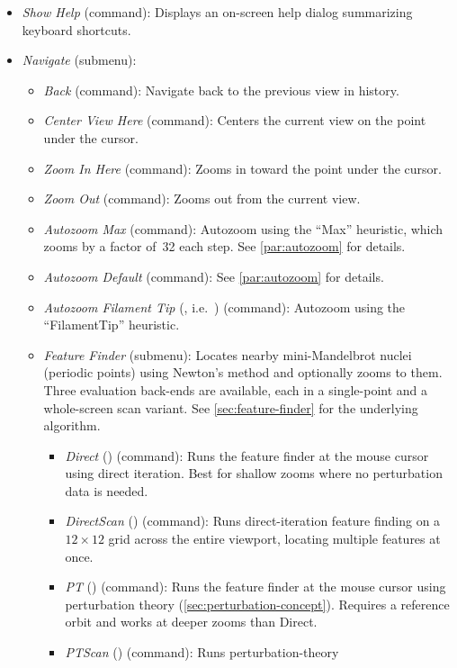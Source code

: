 \begin{itemize}
  \item \emph{Show Help} (command): Displays an on-screen help dialog summarizing keyboard shortcuts.

  \item \emph{Navigate} (submenu):
    \begin{itemize}
      \item \emph{Back} (command): Navigate back to the previous view in history.
      \item \emph{Center View Here} (command): Centers the current view on the
      point under the cursor.
      \item \emph{Zoom In Here} (command): Zooms in toward the point under the cursor.
      \item \emph{Zoom Out} (command): Zooms out from the current view.
      \item \emph{Autozoom Max} (command): Autozoom using the ``Max'' heuristic,
      which zooms by a factor of~32 each step.  See \cref{par:autozoom} for details.
      \item \emph{Autozoom Default} (command): See \cref{par:autozoom} for details.
      \item \emph{Autozoom Filament Tip} (, i.e.\ ) (command): Autozoom using the
      ``FilamentTip'' heuristic.
      \item \emph{Feature Finder} (submenu): Locates nearby mini-Mandelbrot
      nuclei (periodic points) using Newton's method and optionally zooms to
      them.  Three evaluation back-ends are available, each in a single-point
      and a whole-screen scan variant.  See
      \cref{sec:feature-finder} for the underlying algorithm.
        \begin{itemize}
          \item \emph{Direct} () (command): Runs the feature finder at
          the mouse cursor using direct iteration.  Best for shallow zooms where
          no perturbation data is needed.
          \item \emph{DirectScan} () (command): Runs direct-iteration
          feature finding on a $12\times12$ grid across the entire viewport,
          locating multiple features at once.
          \item \emph{PT} () (command): Runs the feature finder at the
          mouse cursor using perturbation theory (\cref{sec:perturbation-concept}).
          Requires a reference orbit and works at deeper zooms than Direct.
          \item \emph{PTScan} () (command): Runs perturbation-theory

\end{itemize}
\end{itemize}
\end{itemize}

